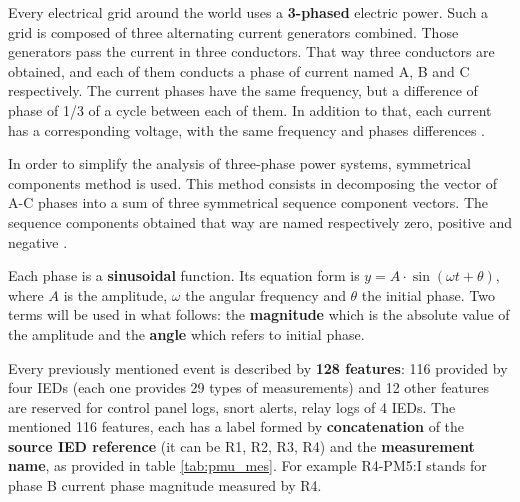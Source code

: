 Every electrical grid around the world uses a \textbf{3-phased} electric power. Such a grid is composed of three alternating current generators combined. Those generators pass the current in three conductors. That way three conductors are obtained, and each of them conducts a phase of current named A, B and C respectively. The current phases have the same frequency, but a difference of phase of 1/3 of a cycle between each of them. In addition to that, each current has a corresponding voltage, with the same frequency and phases differences \cite{noauthor_three-phase_2020}.

In order to simplify the analysis of three-phase power systems, symmetrical components method is used. This method consists in decomposing the vector of A-C phases into a sum of three symmetrical sequence component vectors. The sequence components obtained that way are named respectively zero, positive and negative \cite{noauthor_symmetrical_2019}. 

Each phase is a \textbf{sinusoidal} function. Its equation form is $y = A \cdot \sin(\omega t + \theta)$, where $A$ is the amplitude, $\omega$ the angular frequency and $\theta$ the initial phase. Two terms will be used in what follows: the \textbf{magnitude} which is the absolute value of the amplitude and the \textbf{angle} which refers to initial phase.

Every previously mentioned event is described by \textbf{128 features}: 116 provided by four IEDs (each one provides 29 types of measurements) and 12 other features are reserved for control panel logs, snort alerts, relay logs of 4 IEDs. The mentioned 116 features, each has a label formed by \textbf{concatenation} of the \textbf{source IED reference} (it can be R1, R2, R3, R4) and the \textbf{measurement name}, as provided in table \ref{tab:pmu_mes}. For example R4-PM5:I stands for phase B current phase magnitude measured by R4.

